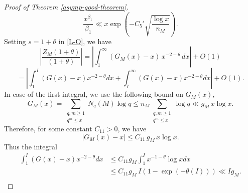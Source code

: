 \documentclass[12pt]{amsart}
\theoremstyle{definition}
\begin{document}
\begin{proof}[Proof of Theorem \ref{asymp-good-theorem}]
\begin{equation*}
    \frac{x^{\beta_1}}{\beta_1} \ll x \exp \left(-C_5' \sqrt{\frac{\log x}{n_M}}\right).
\end{equation*}
Setting $s = 1 + \theta$ in \eqref{L-O}, we have
\begin{equation*}
\left| \frac{Z_M(1+\theta)}{(1+\theta)} \right| = \left|  \int_1^\infty (G_M(x) - x) \, x^{-2-\theta} \, dx \right| +O(1)
\end{equation*}
\begin{equation}\label{integral}
=\left| \int_1^{I} (G(x)-x) x^{-2-\theta} dx +  \int_{I}^{\infty} (G(x) - x) x^{-2-\theta} dx \right| + O(1).
\end{equation}
In case of the first integral, we use the following bound on $G_M(x)$,
\begin{equation*}
G_M(x) = \sum_{\substack{q,m\geq 1\\ q^m\leq x}} N_q(M) \log q \leq n_M \sum_{\substack{q,m \geq 1\\ 
q^m \leq x}} \log q \ll g_M \, x \log x.
\end{equation*}
Therefore, for some constant $C_{11}>0$, we have
\begin{equation*}
|G_M(x) - x| \leq C_{11} \, g_M \, x \log x.
\end{equation*}
Thus the integral
\begin{align*}
 \int_1^{I} (G(x)-x) x^{-2-\theta} dx & \leq C_{11} g_M \int_1^{I} x^{-1-\theta} \log x dx \\
    &\leq C_{11} g_M \, I \left(1 - \exp\left(-\theta \left(I\right) \right)\right) \ll I g_M.\\
\end{align*}


\end{proof}
\end{document}
